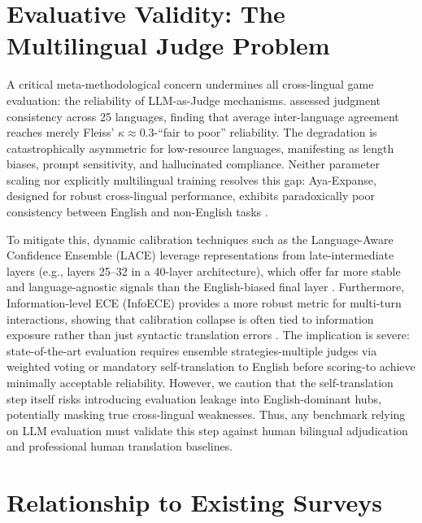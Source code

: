 \documentclass[11pt]{article}
\begin{document}
\section{Evaluative Validity: The Multilingual Judge Problem}
\label{sec:judge}

A critical meta-methodological concern undermines all cross-lingual game evaluation: the reliability of LLM-as-Judge mechanisms. \citet{fu2025multilingualjudge} assessed judgment consistency across 25 languages, finding that average inter-language agreement reaches merely Fleiss' $\kappa \approx 0.3$-``fair to poor'' reliability. The degradation is catastrophically asymmetric for low-resource languages, manifesting as length biases, prompt sensitivity, and hallucinated compliance. Neither parameter scaling nor explicitly multilingual training resolves this gap: Aya-Expanse, designed for robust cross-lingual performance, exhibits paradoxically poor consistency between English and non-English tasks \citep{fu2025multilingualjudge}. 

To mitigate this, dynamic calibration techniques such as the Language-Aware Confidence Ensemble (LACE) leverage representations from late-intermediate layers (e.g., layers 25--32 in a 40-layer architecture), which offer far more stable and language-agnostic signals than the English-biased final layer \citep{zhou2025beyond}. Furthermore, Information-level ECE (InfoECE) provides a more robust metric for multi-turn interactions, showing that calibration collapse is often tied to information exposure rather than just syntactic translation errors \citep{zhang2026confidence}. The implication is severe: state-of-the-art evaluation requires ensemble strategies-multiple judges via weighted voting or mandatory self-translation to English before scoring-to achieve minimally acceptable reliability. However, we caution that the self-translation step itself risks introducing evaluation leakage into English-dominant hubs, potentially masking true cross-lingual weaknesses. Thus, any benchmark relying on LLM evaluation must validate this step against human bilingual adjudication and professional human translation baselines.

\section{Relationship to Existing Surveys}
\label{sec:related}
\end{document}
